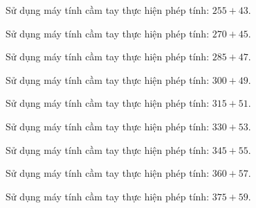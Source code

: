 \begin{ex}
  Sử dụng máy tính cầm tay thực hiện phép tính: $255 + 43$.
\end{ex}

\begin{ex}
  Sử dụng máy tính cầm tay thực hiện phép tính: $270 + 45$.
\end{ex}

\begin{ex}
  Sử dụng máy tính cầm tay thực hiện phép tính: $285 + 47$.
\end{ex}

\begin{ex}
  Sử dụng máy tính cầm tay thực hiện phép tính: $300 + 49$.
\end{ex}

\begin{ex}
  Sử dụng máy tính cầm tay thực hiện phép tính: $315 + 51$.
\end{ex}

\begin{ex}
  Sử dụng máy tính cầm tay thực hiện phép tính: $330 + 53$.
\end{ex}

\begin{ex}
  Sử dụng máy tính cầm tay thực hiện phép tính: $345 + 55$.
\end{ex}

\begin{ex}
  Sử dụng máy tính cầm tay thực hiện phép tính: $360 + 57$.
\end{ex}

\begin{ex}
  Sử dụng máy tính cầm tay thực hiện phép tính: $375 + 59$.
\end{ex}

